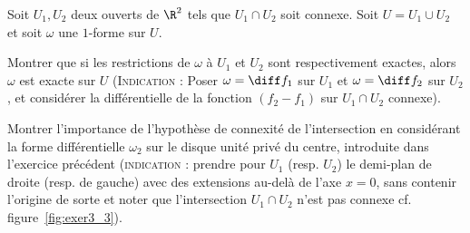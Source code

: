 \begin{exer}
\begin{figure}[H]
\begin{center}
\shorthandon{!}\shorthandoff{:}
\end{center}
\caption{} \label{fig:exer3_2}
\end{figure}
\end{exer}


\begin{exer}
Soit $U_1, U_2$ deux ouverts de $\R^2$ tels que $U_1 \cap U_2$ soit connexe. Soit $U=U_1 \cup U_2$ et soit $\omega$ une $1$-forme sur $U$. 
\begin{MYenumerate}
\item Montrer que si les restrictions de $\omega$ à $U_1$ et $U_2$ sont respectivement exactes, alors $\omega$ est exacte sur $U$ (\textsc{Indication :} Poser $\omega=\diff f_1$ sur $U_1$ et $\omega=\diff f_2$ sur $U_2$, et considérer la différentielle de la fonction $(f_2-f_1)$ sur $U_1\cap U_2$ connexe).
\item Montrer l'importance de l'hypothèse de connexité de l'intersection en considérant la forme différentielle $\omega_2$ sur le disque unité privé du centre, introduite dans l'exercice précédent (\textsc{indication :} prendre pour $U_1$ (resp. $U_2$) le demi-plan de droite (resp. de gauche) avec des extensions au-delà de l'axe $x=0$, sans contenir l'origine de sorte et noter que l'intersection $U_1 \cap U_2$ n'est pas connexe cf. figure~\ref{fig:exer3_3}).
\end{MYenumerate}


\end{exer}
